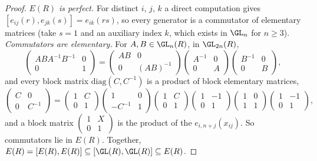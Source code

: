 \begin{proof}
\emph{$E(R)$ is perfect.} For distinct $i$, $j$, $k$ a direct computation gives $[e_{ij}(r), e_{jk}(s)] = e_{ik}(rs)$, so every generator is a commutator of elementary matrices (take $s = 1$ and an auxiliary index $k$,
which exists in $\GL_n$ for $n \geq 3$). \emph{Commutators are elementary.} For $A, B \in \GL_n(R)$, in $\GL_{2n}(R)$,
\[
\begin{pmatrix} ABA^{-1}B^{-1} & 0 \\ 0 & 1 \end{pmatrix} = \begin{pmatrix} AB & 0 \\ 0 & (AB)^{-1} \end{pmatrix}\begin{pmatrix} A^{-1} & 0 \\ 0 & A \end{pmatrix}\begin{pmatrix} B^{-1} & 0 \\ 0 & B \end{pmatrix},
\]
and every block matrix $\mathrm{diag}(C, C^{-1})$ is a product of block elementary matrices,
\[
\begin{pmatrix} C & 0 \\ 0 & C^{-1} \end{pmatrix} = \begin{pmatrix} 1 & C \\ 0 & 1 \end{pmatrix}\begin{pmatrix} 1 & 0 \\ -C^{-1} & 1 \end{pmatrix}\begin{pmatrix} 1 & C \\ 0 & 1 \end{pmatrix}\begin{pmatrix} 1 & -1 \\ 0 & 1 \end{pmatrix}\begin{pmatrix} 1 & 0 \\ 1 & 1 \end{pmatrix}\begin{pmatrix} 1 & -1 \\ 0 & 1 \end{pmatrix},
\]
and a block matrix $\begin{pmatrix} 1 & X \\ 0 & 1 \end{pmatrix}$ is the product of the $e_{i, n+j}(x_{ij})$. So commutators lie in $E(R)$. Together, $E(R) = [E(R), E(R)] \subseteq [\GL(R), \GL(R)] \subseteq E(R)$.
\end{proof}

